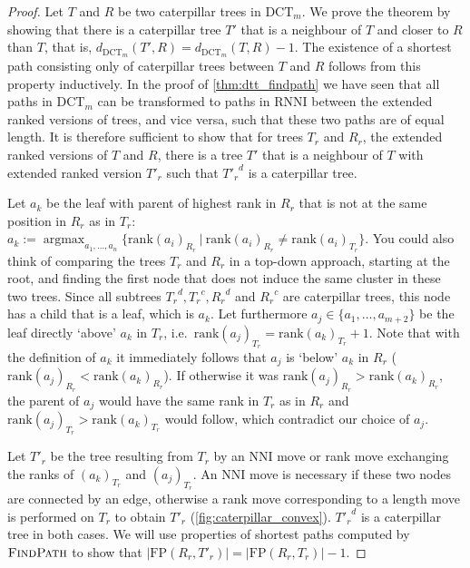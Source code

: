 \documentclass[11pt]{amsart}
\newcommand{\rnni}{\mathrm{RNNI}}
\newcommand{\findpath}{\textsc{FindPath}}
\newcommand{\rank}{\mathrm{rank}}
\newcommand{\nni}{\mathrm{NNI}}
\newcommand{\fp}{\mathrm{FP}}
\newcommand{\dct}{\mathrm{DCT}}
\DeclareMathOperator*{\argmax}{argmax}
\begin{document}
\begin{proof}
	Let $T$ and $R$ be two caterpillar trees in $\dct_m$.
	We prove the theorem by showing that there is a caterpillar tree $T'$ that is a neighbour of $T$ and closer to $R$ than $T$, that is, $d_{\dct_m}(T', R) = d_{\dct_m}(T, R) - 1$.
	The existence of a shortest path consisting only of caterpillar trees between $T$ and $R$ follows from this property inductively.
	In the proof of \autoref{thm:dtt_findpath} we have seen that all paths in $\dct_m$ can be transformed to paths in $\rnni$ between the extended ranked versions of trees, and vice versa, such that these two paths are of equal length.
	It is therefore sufficient to show that for trees $T_r$ and $R_r$, the extended ranked versions of $T$ and $R$, there is a tree $T'$ that is a neighbour of $T$ with extended ranked version $T'_r$ such that ${T'_r}^d$ is a caterpillar tree.

	Let $a_k$ be the leaf with parent of highest rank in $R_r$ that is not at the same position in $R_r$ as in $T_r$: $a_k := \argmax_{a_1, \ldots, a_n}\{\rank(a_i)_{R_r} \ |\  \rank(a_i)_{R_r} \neq \rank(a_i)_{T_r}\}$.
	You could also think of comparing the trees $T_r$ and $R_r$ in a top-down approach, starting at the root, and finding the first node that does not induce the same cluster in these two trees.
	Since all subtrees ${T_r}^d, {T_r}^c, {R_r}^d$ and ${R_r}^c$ are caterpillar trees, this node has a child that is a leaf, which is $a_k$.
	Let furthermore $a_j \in \{a_1, \ldots, a_{m+2}\}$ be the leaf directly `above' $a_k$ in $T_r$, i.e.\ $\rank(a_j)_{T_r} = \rank(a_k)_{T_r} + 1$.
	Note that with the definition of $a_k$ it immediately follows that $a_j$ is `below' $a_k$ in $R_r$ ($\rank(a_j)_{R_r} < \rank(a_k)_{R_r}$).
	If otherwise it was $\rank(a_j)_{R_r} > \rank(a_k)_{R_r}$, the parent of $a_j$ would have the same rank in $T_r$ as in $R_r$ and $\rank(a_j)_{T_r} > \rank(a_k)_{T_r}$ would follow, which contradict our choice of $a_j$.
 
	Let $T'_r$ be the tree resulting from $T_r$ by an $\nni$ move or rank move exchanging the ranks of $(a_k)_{T_r}$ and $(a_j)_{T_r}$.
	An $\nni$ move is necessary if these two nodes are connected by an edge, otherwise a rank move corresponding to a length move is performed on $T_r$ to obtain $T'_r$ (\autoref{fig:caterpillar_convex}).
	${T'_r}^d$ is a caterpillar tree in both cases.
	We will use properties of shortest paths computed by $\findpath$ to show that $|\fp(R_r,T'_r)| = |\fp(R_r,T_r)| - 1$.


\end{proof}
\end{document}
